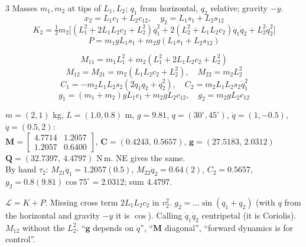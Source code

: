 \begin{multicols}{3}
Masses $m_1,m_2$ at tips of $L_1,L_2$; $q_1$ from horizontal, $q_2$ relative; gravity $-y$.
\[x_2=L_1c_1+L_2c_{12},\quad y_2=L_1s_1+L_2s_{12}\]
\[K_2=\tfrac12m_2\big[(L_1^2{+}2L_1L_2c_2{+}L_2^2)\dot q_1^2+2(L_2^2{+}L_1L_2c_2)\dot q_1\dot q_2+L_2^2\dot q_2^2\big]\]
\[P=m_1gL_1s_1+m_2g(L_1s_1+L_2s_{12})\]
\begin{fbx}[Result \pg{22--25}]
\[M_{11}=m_1L_1^2+m_2(L_1^2+2L_1L_2c_2+L_2^2)\]
\[M_{12}=M_{21}=m_2(L_1L_2c_2+L_2^2),\quad M_{22}=m_2L_2^2\]
\[C_1=-m_2L_1L_2s_2(2\dot q_1\dot q_2+\dot q_2^2),\quad C_2=m_2L_1L_2s_2\dot q_1^2\]
\[g_1=(m_1{+}m_2)gL_1c_1+m_2gL_2c_{12},\quad g_2=m_2gL_2c_{12}\]
\end{fbx}
\begin{worked}[2R torques]
$m=(2,1)$ kg, $L=(1.0,0.8)$ m, $g=9.81$, $q=(30^\circ,45^\circ)$, $\dot q=(1,-0.5)$, $\ddot q=(0.5,2)$:\\
$\mathbf M=\begin{bmatrix}4.7714&1.2057\\1.2057&0.6400\end{bmatrix}$, $\mathbf C=(0.4243,\,0.5657)$, $\mathbf g=(27.5183,\,2.0312)$\\
$\mathbf Q=(32.7397,\ 4.4797)$ N\,m. NE gives the same. \chk\\
By hand $\tau_2$: $M_{21}\ddot q_1{=}1.2057(0.5)$, $M_{22}\ddot q_2{=}0.64(2)$, $C_2{=}0.5657$, $g_2{=}0.8(9.81)\cos75^\circ{=}2.0312$; sum $4.4797$.
\end{worked}
\begin{trap}
$\mathcal L=K+P$. Missing cross term $2L_1L_2c_2$ in $v_2^2$. $g_2=\dots\sin(q_1{+}q_2)$ (with $q$ from the horizontal and gravity $-y$ it is $\cos$). Calling $\dot q_1\dot q_2$ centripetal (it is Coriolis). $M_{12}$ without the $L_2^2$. ``$\mathbf g$ depends on $\dot q$'', ``$\mathbf M$ diagonal'', ``forward dynamics is for control''. \chk
\end{trap}


\end{multicols}
